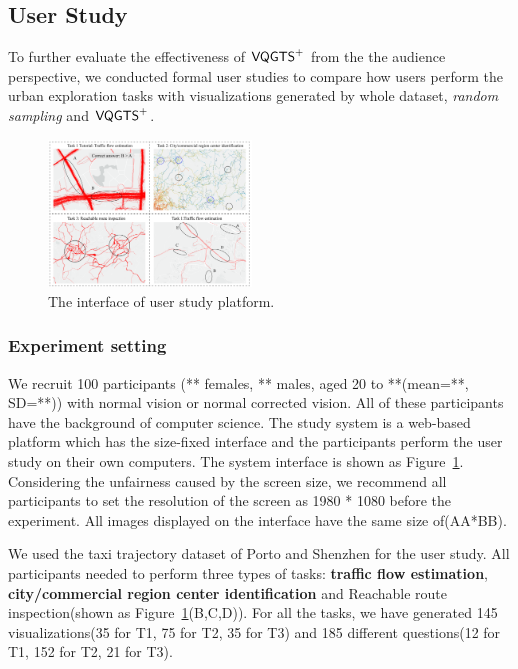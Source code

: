 \subsection{User Study}
To further evaluate the effectiveness of $\mathsf{VQGTS}^{+}$ from the the audience perspective, we conducted formal user studies to compare how users perform the urban exploration tasks with visualizations generated by whole dataset, \textit{random sampling} and $\mathsf{VQGTS}^{+}$.


\begin{figure}[t]
	\centering
	\includegraphics[width=0.48\textwidth]{pictures/user_study/interface.pdf}
	\vspace{-3mm}
	\caption{The interface of user study platform.}
	\vspace{-5mm}
	\label{fig:user_study}
\end{figure}

\subsubsection{Experiment setting}

We recruit 100 participants (** females, ** males, aged 20 to **(mean=**, SD=**)) with normal vision or normal corrected vision. All of these participants have the background of computer science. 
The study system is a web-based platform which has the size-fixed interface and the participants perform the user study on their own  computers. The system interface is shown as Figure~\ref{fig:user_study}. Considering the unfairness caused by the screen size, we recommend all participants to set the resolution of the screen as 1980 * 1080 before the experiment. All images displayed on the interface have the same size of(AA*BB).  

We used the taxi trajectory dataset of Porto and Shenzhen for the user study. All participants needed to perform three types of tasks: \textbf{traffic flow estimation},\textbf{ city/commercial region center identification} and Reachable route inspection(shown as Figure~\ref{fig:user_study}(B,C,D)). For all the tasks, we have generated 145 visualizations(35 for T1, 75 for T2, 35 for T3) and 185 different questions(12 for T1, 152 for T2, 21 for T3). 

